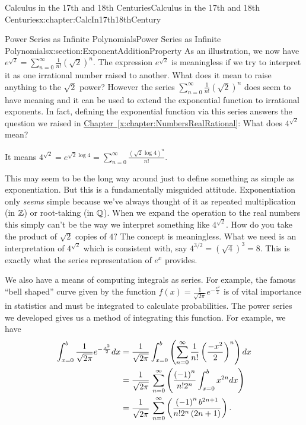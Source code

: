 \begin{chapterptx}{Calculus in the 17th and 18th Centuries}{}{Calculus in the 17th and 18th Centuries}{}{}{x:chapter:CalcIn17th18thCentury}
\begin{sectionptx}{Power Series as Infinite Polynomials}{}{Power Series as Infinite Polynomials}{}{}{x:section:ExponentAdditionProperty}
		As an illustration, we now have \(e^{\sqrt{2}}=\sum_{n=0}^\infty\frac{1}{n!}\left(\sqrt{2}\right)^n\). The expression \(e^{\sqrt{2}}\) is meaningless if we try to interpret it as one irrational number raised to another. What does it mean to raise anything to the \(\sqrt{2}\) power? However the series \(\sum_{n=0}^\infty\frac{1}{n!}\left(\sqrt{2}\right)^n\) does seem to have meaning and it can be used to extend the exponential function to irrational exponents. In fact, defining the exponential function via this series answers the question we raised in  \hyperref[x:chapter:NumbersRealRational]{Chapter~{\xreffont\ref{x:chapter:NumbersRealRational}}}: What does \(4^{\sqrt{2}}\) mean?%
		\par
		It means \(\displaystyle 4^{\sqrt{2}} = e^{\sqrt{2}\log 4} = \sum_{n=0}^\infty\frac{(\sqrt{2}\log 4)^n}{n!}\).%
		\par
		This may seem to be the long way around just to define something as simple as exponentiation. But this is a fundamentally misguided attitude. Exponentiation only \emph{seems} simple because we've always thought of it as repeated multiplication (in \(\mathbb {Z}\)) or root-taking (in \(\mathbb {Q}\)). When we expand the operation to the real numbers this simply can't be the way we interpret something like \(4^{\sqrt{2}}\). How do you take the product of \(\sqrt{2}\) copies of \(4?\) The concept is meaningless. What we need is an interpretation of \(4^{\sqrt{2}}\) which is consistent with, say \(4^{3/2} = \left(\sqrt{4}\right)^3=8\). This is exactly what the series representation of \(e^x\) provides.%
		\par
		We also have a means of computing integrals as series. For example, the famous ``bell shaped'' curve given by the function \(f(x)=\frac{1}{\sqrt{2\pi}}e^{-\frac{x^2}{2}}\) is of vital importance in statistics and must be integrated to calculate probabilities. The power series we developed gives us a method of integrating this function. For example, we have%
		\begin{align*}
			\int_{x=0}^b\frac{1}{\sqrt{2\pi}}e^{-\frac{x^2}{2}}d x &  =\frac{1}{\sqrt{2\pi}}\int_{x=0}^b\left(\sum_{n=0}^\infty\frac{1}{n!}\left(\frac{-x^2}{2}\right)^n\right)d x\\
			& =\frac{1}{\sqrt{2\pi}}\,\sum_{n=0}^\infty\left(\frac{\left(-1\right)^n}{n!2^n}\int_{x=0}^bx^{2n}d x\right)\\
			& =\frac{1}{\sqrt{2\pi}}\,\sum_{n=0}^\infty\left(\frac{\left(-1\right)^nb^{2n+1}}{n!2^n\left(2n+1\right)}\right)\text{.}
		\end{align*}

\end{sectionptx}
\end{chapterptx}
